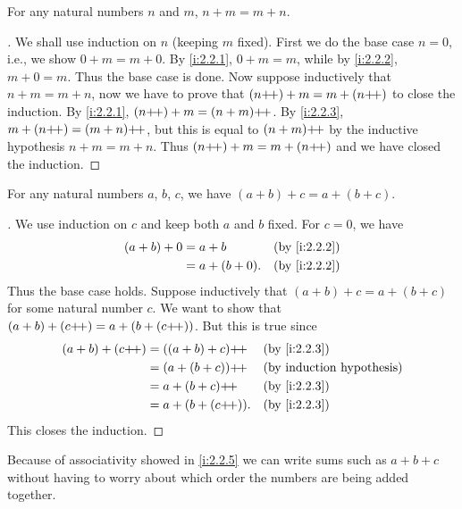 \begin{prop}\label{i:2.2.4}
  For any natural numbers \(n\) and \(m\), \(n + m = m + n\).
\end{prop}

\begin{proof}[]
  We shall use induction on \(n\) (keeping \(m\) fixed).
  First we do the base case \(n = 0\), i.e., we show \(0 + m = m + 0\).
  By \cref{i:2.2.1}, \(0 + m = m\), while by \cref{i:2.2.2}, \(m + 0 = m\).
  Thus the base case is done.
  Now suppose inductively that \(n + m = m + n\), now we have to prove that \((n{+}\!{+}) + m = m + (n{+}\!{+})\) to close the induction.
  By \cref{i:2.2.1}, \((n{+}\!{+}) + m = (n + m){+}\!{+}\).
  By \cref{i:2.2.3}, \(m + (n{+}\!{+}) = (m + n){+}\!{+}\), but this is equal to \((n + m){+}\!{+}\) by the inductive hypothesis \(n+m=m+n\).
  Thus \((n{+}\!{+}) + m = m + (n{+}\!{+})\) and we have closed the induction.
\end{proof}

\begin{prop}\label{i:2.2.5}
  For any natural numbers \(a\), \(b\), \(c\), we have \((a + b) + c = a + (b + c)\).
\end{prop}

\begin{proof}[]
  We use induction on \(c\) and keep both \(a\) and \(b\) fixed.
  For \(c = 0\), we have
  \begin{align*}
    (a + b) + 0 & = a + b        &  & \by{i:2.2.2} \\
                & = a + (b + 0). &  & \by{i:2.2.2}
  \end{align*}
  Thus the base case holds.
  Suppose inductively that \((a + b) + c = a + (b + c)\) for some natural number \(c\).
  We want to show that \((a + b) + (c{+}\!{+}) = a + (b + (c{+}\!{+}))\).
  But this is true since
  \begin{align*}
    (a + b) + (c\pp) & = ((a + b) + c)\pp  &  & \by{i:2.2.3} \\
                     & = (a + (b + c))\pp  &  & \byIH        \\
                     & = a + (b + c)\pp    &  & \by{i:2.2.3} \\
                     & = a + (b + (c\pp)). &  & \by{i:2.2.3}
  \end{align*}
  This closes the induction.
\end{proof}

\begin{note}
  Because of associativity showed in \cref{i:2.2.5} we can write sums such as \(a + b + c\) without having to worry about which order the numbers are being added together.
\end{note}

